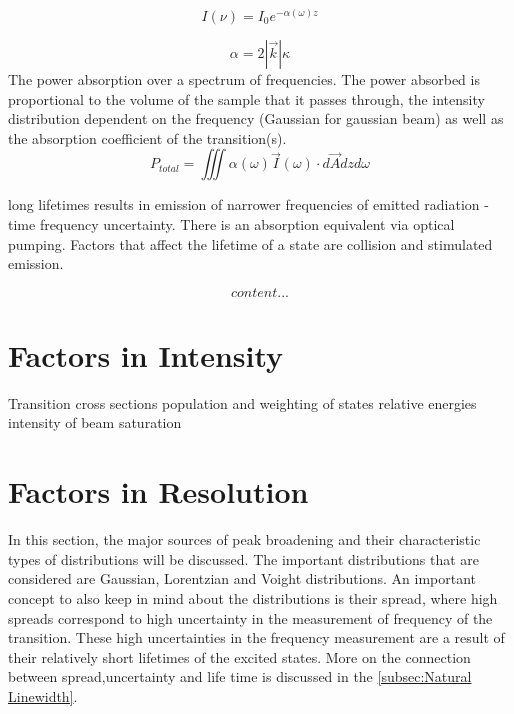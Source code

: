 \documentclass[11pt,a4paper]{book}
\begin{document}
\begin{equation}
I(\nu)=I_0 e^{-\alpha(\omega)z}
\end{equation}

\begin{equation}
\alpha=2 |\vec{k}|\kappa
\end{equation}
The power absorption over a spectrum of frequencies. The power absorbed is proportional to the volume of the sample that it passes through, the intensity distribution dependent on the frequency (Gaussian for gaussian beam) as well as the absorption coefficient of the transition(s).
\begin{equation}
P_{total}=\iiint{\alpha(\omega)\vec{I}(\omega)\cdot d\vec{A} dz}d\omega
\end{equation}

long lifetimes results in emission of narrower  frequencies of emitted radiation - time frequency uncertainty. There is an absorption equivalent via optical pumping. Factors that affect the lifetime of a state are collision and stimulated emission.

\begin{equation}
content...
\end{equation}
\section{Factors in Intensity}
\label{sec:Factors in Intensity}
Transition cross sections
population and weighting of states
relative energies
intensity of beam
saturation

\section{Factors in Resolution}
\label{sec:Factors in Resolution}
In this section, the major sources of peak broadening and their characteristic types of distributions will be discussed. The important distributions that are considered are Gaussian, Lorentzian and Voight distributions. An important concept to also keep in mind about the distributions is their spread, where high spreads correspond to high uncertainty in the measurement of frequency of the transition. These high uncertainties in the frequency measurement are a result of their relatively short lifetimes of the excited states. More on the connection between spread,uncertainty and life time is discussed in the \autoref{subsec:Natural Linewidth}.
\end{document}
